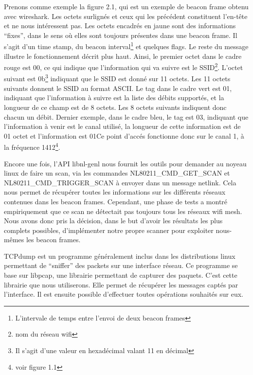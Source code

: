 Prenons comme exemple la figure 2.1, qui est un exemple de beacon frame obtenu avec wireshark. Les octets surlignés et ceux qui
les précédent constituent l'en-tête et ne nous intéressent pas. Les octets encadrés en jaune sont des informations ``fixes'', dans
le sens où elles sont toujours présentes dans une beacon frame. Il s'agit d'un time stamp, du beacon interval\footnote{L'intervale
de temps entre l'envoi de deux beacon frames} et quelques flags. Le reste du message illustre le fonctionnement décrit plus
haut. Ainsi, le premier octet dans le cadre rouge est 00, ce qui indique que l'information qui va suivre est le SSID\footnote{nom du
réseau wifi}. L'octet suivant est 0b\footnote{Il s'agit d'une valeur en hexadécimal valant 11 en décimal} indiquant que le SSID est
donné sur 11 octets. Les 11 octets suivants donnent le SSID au format ASCII. Le tag dans le cadre vert est 01, indiquant que 
l'information à suivre est la liste des débits supportés, et la longueur de ce champ est de 8 octets. Les 8 octets suivants indiquent
donc chacun un débit. Dernier exemple, dans le cadre bleu, le tag est 03, indiquant que l'information à venir est le canal utilisé, la 
longueur de cette information est de 01 octet et l'information est 01Ce point d'accés fonctionne donc sur le canal 1, à la
fréquence 1412\footnote{voir figure 1.1}.

Encore une fois, l'API libnl-genl nous fournit les outils pour demander au noyeau linux de faire un scan, via les commandes
NL80211\_\-CMD\_\-GET\_\-SCAN et NL80211\_\-CMD\_\-TRIGGER\_\-SCAN à envoyer dans un message netlink. Cela nous permet de récupérer toutes les
informations sur les différents réseaux contenues dans les beacon frames. Cependant, une phase de tests a montré
empiriquement que ce scan ne détectait pas toujours tous les réseaux wifi mesh. Nous avons donc pris la décision, dans le but
d'avoir les résultats les plus complets possibles, d'implémenter notre propre scanner pour exploiter nous-mêmes les beacon frames.

TCPdump est un programme généralement inclus dans les distributions linux permettant de ``sniffer'' des packets sur une interface
réseau. Ce programme se base sur libpcap\cite{SCANlib}, une librairie permettant de capturer des paquets. C'est cette librairie que
nous utiliserons. Elle permet de récupérer les messages captés par l'interface. Il est ensuite possible
d'effectuer toutes opérations souhaités sur eux.

